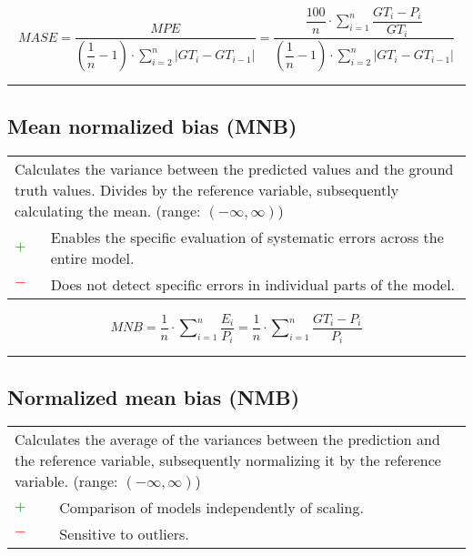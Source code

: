 \documentclass{article}
\begin{document}
\begin{equation}
	\textit{MASE} = \dfrac{\textit{MPE}}{\left(\dfrac{1}{n} - 1\right) \cdot \sum\nolimits_{i = 2}^n |\textit{GT}_i - \textit{GT}_{i - 1}|} = \dfrac{\dfrac{100}{n} \cdot \sum\nolimits_{i = 1}^n \dfrac{\textit{GT}_i - P_i}{\textit{GT}_i}}{\left(\dfrac{1}{n} - 1\right) \cdot \sum\nolimits_{i = 2}^n |\textit{GT}_i - \textit{GT}_{i - 1}|}
%
	\label{equation:MASE}
\end{equation}

\hrule


\subsection[Mean normalized bias (MNB)]{Mean normalized bias (MNB) \cite{yu2006new, tsigaridis2014aerocom}}

\begin{table}[H]\centering
	\begin{tabular}{m{}m{}}
		\multicolumn{2}{m{0.95\textwidth}}{Calculates the variance between the predicted values and the ground truth values. Divides by the reference variable, subsequently calculating the mean. (range: $(-\infty, \infty)$)} \\
		\textcolor{Green}{$+$} & Enables the specific evaluation of systematic errors across the entire model. \\
		\textcolor{Red}{$-$}   & Does not detect specific errors in individual parts of the model.
	\end{tabular}
\end{table}

\begin{equation}
	\textit{MNB} = \dfrac{1}{n} \cdot \sum\nolimits_{i = 1}^n \dfrac{E_i}{P_i} = \dfrac{1}{n} \cdot \sum\nolimits_{i = 1}^n \dfrac{\textit{GT}_i - P_i}{P_i}
%
	\label{equation:MNB}
\end{equation}

\hrule


\subsection[Normalized mean bias (NMB)]{Normalized mean bias (NMB) \cite{mebust2003models, yu2006new}}

\begin{table}[H]\centering
	\begin{tabular}{m{}m{}}
		\multicolumn{2}{m{0.95\textwidth}}{Calculates the average of the variances between the prediction and the reference variable, subsequently normalizing it by the reference variable. (range: $(-\infty, \infty)$)} \\
		\textcolor{Green}{$+$} & Comparison of models independently of scaling. \\
		\textcolor{Red}{$-$}   & Sensitive to outliers.
	\end{tabular}
\end{table}
\end{document}
